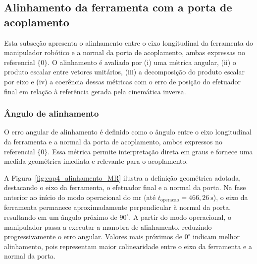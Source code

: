 
\subsection{Alinhamento da ferramenta com a porta de acoplamento}
\label{subsec:cap4_alinhamento}

Esta subseção apresenta o alinhamento entre o eixo longitudinal da ferramenta do manipulador robótico e a normal da porta de acoplamento, ambas expressas no referencial $\{0\}$.
O alinhamento é avaliado por
(i) uma métrica angular,
(ii) o produto escalar entre vetores unitários,
(iii) a decomposição do produto escalar por eixo e
(iv) a coerência dessas métricas com o erro de posição do efetuador final em relação à referência gerada pela cinemática inversa.



\subsubsection{Ângulo de alinhamento}
\label{subsubsec:cap4_alinhamento_angulo}

O erro angular de alinhamento é definido como o ângulo entre o eixo longitudinal da ferramenta e a normal da porta de acoplamento, ambos expressos no referencial $\{0\}$.
Essa métrica permite interpretação direta em graus e fornece uma medida geométrica imediata e relevante para o acoplamento.

A Figura~\ref{fig:cap4_alinhamento_MR} ilustra a definição geométrica adotada, destacando o eixo da ferramenta, o efetuador final e a normal da porta.
Na fase anterior ao início do modo operacional do \gls{mr} (até $t_\text{operacao}=466{,}26~\mathrm{s}$), o eixo da ferramenta permanece aproximadamente perpendicular à normal da porta, resultando em um ângulo próximo de $90^\circ$.
A partir do modo operacional, o manipulador passa a executar a manobra de alinhamento, reduzindo progressivamente o erro angular.
Valores mais próximos de $0^\circ$ indicam melhor alinhamento, pois representam maior colinearidade entre o eixo da ferramenta e a normal da porta.

